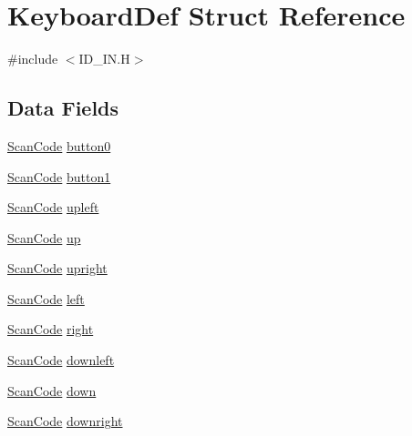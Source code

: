 \hypertarget{structKeyboardDef}{
\section{KeyboardDef Struct Reference}
\label{structKeyboardDef}
}


{\ttfamily \#include $<$ID\_\-IN.H$>$}

\subsection*{Data Fields}
\begin{DoxyCompactItemize}
\item 
\hyperlink{ID__IN_8H_a92ee9291fc7e992c1662c4e195242f2d}{ScanCode} \hyperlink{structKeyboardDef_ab5b72621607ec34ff3c3d55400bbb713}{button0}
\item 
\hyperlink{ID__IN_8H_a92ee9291fc7e992c1662c4e195242f2d}{ScanCode} \hyperlink{structKeyboardDef_ac4bd567a47b42d884684d13cf94175df}{button1}
\item 
\hyperlink{ID__IN_8H_a92ee9291fc7e992c1662c4e195242f2d}{ScanCode} \hyperlink{structKeyboardDef_af7fa54d606cad8d67a8bc63d34223e6d}{upleft}
\item 
\hyperlink{ID__IN_8H_a92ee9291fc7e992c1662c4e195242f2d}{ScanCode} \hyperlink{structKeyboardDef_a686d251fafc9949ceff912a8e3de3b21}{up}
\item 
\hyperlink{ID__IN_8H_a92ee9291fc7e992c1662c4e195242f2d}{ScanCode} \hyperlink{structKeyboardDef_a0b92318bb08cc930a068e54aac4612fa}{upright}
\item 
\hyperlink{ID__IN_8H_a92ee9291fc7e992c1662c4e195242f2d}{ScanCode} \hyperlink{structKeyboardDef_a9a0a0d613d9f1320ea3b59a63e51ed54}{left}
\item 
\hyperlink{ID__IN_8H_a92ee9291fc7e992c1662c4e195242f2d}{ScanCode} \hyperlink{structKeyboardDef_abdc1b4575cee3d0e0ade5111d5acfcbe}{right}
\item 
\hyperlink{ID__IN_8H_a92ee9291fc7e992c1662c4e195242f2d}{ScanCode} \hyperlink{structKeyboardDef_abf8c690077408da30178afd455cdaf26}{downleft}
\item 
\hyperlink{ID__IN_8H_a92ee9291fc7e992c1662c4e195242f2d}{ScanCode} \hyperlink{structKeyboardDef_a1e26793e9a6463b3c8c91bdbcf5a4c51}{down}
\item 
\hyperlink{ID__IN_8H_a92ee9291fc7e992c1662c4e195242f2d}{ScanCode} \hyperlink{structKeyboardDef_a930c406144180a835ab921754fc36554}{downright}
\end{DoxyCompactItemize}


